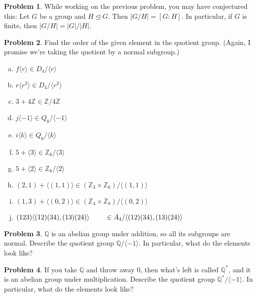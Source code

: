 \documentclass[12pt]{article}
\theoremstyle{definition} %
\newtheorem{problem}{Problem}
\newcommand{\Q}{\mathbb{Q}}
\newcommand{\Z}{\mathbb{Z}}
\def\<{\langle}
\def\>{\rangle}
\def\normaleq{\unlhd}
\begin{document}
\begin{problem}
    While working on the previous problem, you may have conjectured this: Let $G$ be a group and $H \normaleq G$. Then $|G/H| = [G:H]$. 
    In particular, if $G$ is finite, then $|G/H| = |G| / |H|$.
\end{problem}

\begin{problem}\label{orders}
    Find the order of the given element in the quotient group. (Again, I promise we're taking the quotient by a normal subgroup.)
    \begin{multicols}{2}
        \begin{enumerate}[(a)]
            \item $f\<r\> \in D_4 / \< r \>$
            \item $r\<r^2\> \in D_4 / \< r^2 \>$
            \item $3+4\Z \in \Z / 4\Z$
            \item $j\<-1\> \in Q_8 / \< -1 \>$
            \item $i\<k\> \in Q_8 / \< k \>$
            \item $5 + \<3\> \in \Z_6 / \< 3 \>$
            \item $5 + \<2\> \in \Z_6 / \< 2 \>$
            \item $(2, 1) + \< (1, 1) \> \in (\Z_3 \times \Z_6) / \< (1, 1) \>$
            \item $(1, 3) + \< (0 ,2) \> \in (\Z_4 \times \Z_8) / \< (0 ,2) \>$
            \item $(123) \<(12)(34), (13)(24)\> \\
            \phantom{.}\qquad \in A_4 / \<(12)(34), (13)(24)\>$
        \end{enumerate}
    \end{multicols}
\end{problem}

\begin{problem}
    $\Q$ is an abelian group under addition, so all its subgroups are normal. Describe the quotient group $\Q / \<-1\>$. In particular, what do the elements look like?
\end{problem}

\begin{problem}
    If you take $\Q$ and throw away 0, then what's left is called $\Q^*$, and it is an abelian group under multiplication. Describe the quotient group $\Q^* / \<-1\>$. In particular, what do the elements look like?
\end{problem}
\end{document}
